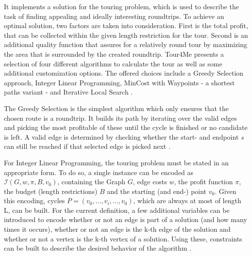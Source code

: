 
It implements a solution for the \glqq touring problem\grqq , which is used to describe the task of finding appealing and ideally interesting roundtrips.
To achieve an optimal solution, two factors are taken into consideration.
First is the total profit, that can be collected within the given length restriction for the tour.
Second is an additional quality function that assures for a relatively round tour by maximizing the area that is surrounded by the created roundtrip.
Tour4Me presents a selection of four different algorithms to calculate the tour as well as some additional customization options.
The offered choices include a Greedy Selection approach, Integer Linear Programming, MinCost with Waypoints - a shortest paths variant - and Iterative Local Search \cite{buchin_tour4me_2022}. 

The Greedy Selection is the simplest algorithm which only ensures that the chosen route is a roundtrip.
It builds its path by iterating over the valid edges and picking the most profitable of these until the cycle is finished or no candidate is left.
A valid edge is determined by checking whether the start- and endpoint \textit{s} can still be reached if that selected edge is picked next \cite{buchin_tour4me_2022}.


For Integer Linear Programming, the touring problem must be stated in an appropriate form.
To do so, a single instance can be encoded as $\mathcal{I}(G, w, \pi, B, v_0)$, containing the Graph $G$, edge costs $w$, the profit function $\pi$, the budget (length restrictions) $B$ and the starting (and end-) point $v_0$.
Given this encoding, cycles $P=(v_0,...,v_i,...,v_0)$, which are always at most of length L, can be built.
For the current definition, a few additional variables can be introduced to encode whether or not an edge is part of a solution (and how many times it occurs), whether or not an edge is the k-th edge of the solution and whether or not a vertex is the k-th vertex of a solution. 
Using these, constraints can be built to describe the desired behavior of the algorithm \cite{buchin_tour4me_2022}.

